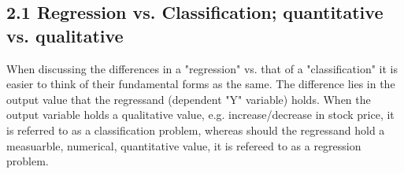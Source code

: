 \documentclass{article}
\begin{document}
\subsection*{2.1 \space Regression vs. Classification; quantitative vs. qualitative}
\hspace{1.27cm}\par
When discussing the differences in a "regression" vs. that of a "classification" it is easier to think of their fundamental forms as the same. The difference lies in the output value that the regressand (dependent "Y" variable) holds. When the output variable holds a qualitative value, e.g. increase/decrease in stock price, it is referred to as a classification problem, whereas should the regressand hold a measuarble, numerical, quantitative value, it is refereed to as a regression problem.
\hspace{1.27cm}\par
\end{document}
